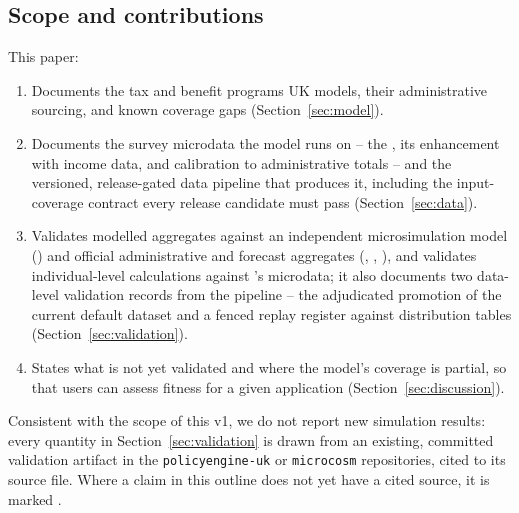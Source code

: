 \subsection{Scope and contributions}

This paper:

\begin{enumerate}
    \item Documents the tax and benefit programs \policyengine{} UK models,
    their administrative sourcing, and known coverage gaps
    (Section~\ref{sec:model}).
    \item Documents the survey microdata the model runs on -- the \frs{},
    its enhancement with \hmrc{} \spi{} income data, and calibration to
    administrative totals -- and the versioned, release-gated data
    pipeline that produces it, including the input-coverage contract every
    release candidate must pass (Section~\ref{sec:data}).
    \item Validates modelled aggregates against an independent
    microsimulation model (\ukmod{}) and official administrative and
    forecast aggregates (\hmrc{}, \dwp{}, \obr{}), and validates
    individual-level calculations against \hmrc{}'s \spi{} microdata; it
    also documents two data-level validation records from the \microcosm{}
    pipeline -- the adjudicated promotion of the current default dataset
    and a fenced replay register against \hmrc{} distribution tables
    (Section~\ref{sec:validation}).
    \item States what is not yet validated and where the model's coverage is
    partial, so that users can assess fitness for a given application
    (Section~\ref{sec:discussion}).
\end{enumerate}

Consistent with the scope of this v1, we do not report new simulation
results: every quantity in Section~\ref{sec:validation} is drawn from an
existing, committed validation artifact in the \texttt{policyengine-uk} or
\texttt{microcosm} repositories, cited to its source file. Where a claim in
this outline does not yet have a cited source, it is marked
.
